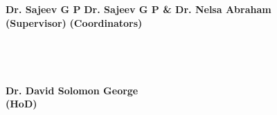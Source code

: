 \begin{titlepage}
\begin{tabbing}
\textbf{Dr. Sajeev G P} \hspace{.9in} \textbf{\small{Dr. Sajeev G P \&   Dr. Nelsa Abraham}}\\\textbf{ (Supervisor)} \hspace{2.6in} \textbf{(Coordinators)} 
\vspace{1.1in}\\ \\ \\ \\
\vspace{1.1in}\\
  \hspace{2.0in} \textbf{Dr. David Solomon George}\\
  \hspace{2.9in} \textbf{(HoD)}\\
\vspace{.1in}\\
\vspace{.1in}\\
\end{tabbing}
\end{titlepage}
